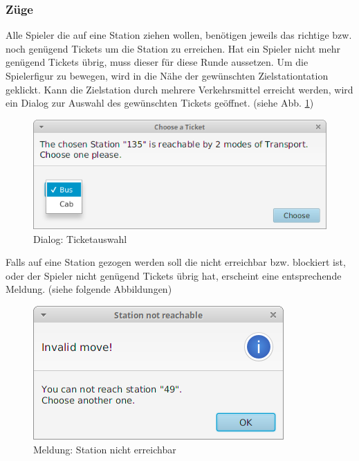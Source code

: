         \subsubsection{Züge}
            Alle Spieler die auf eine Station ziehen wollen, benötigen jeweils das richtige bzw. noch genügend Tickets um die Station zu erreichen.
            Hat ein Spieler nicht mehr genügend Tickets übrig, muss dieser für diese Runde aussetzen.
            \newline
            \newline
            Um die Spielerfigur zu bewegen, wird in die Nähe der gewünschten Zielstationtation geklickt.
            Kann die Zielstation durch mehrere Verkehrsmittel erreicht werden, wird ein Dialog zur Auswahl
            des gewünschten Tickets geöffnet. (siehe Abb. \ref{abb_dialogchooseticket})

            \begin{figure}[H]
                \centering
                \includegraphics[scale=0.6]{img/benutzerhandbuch/dialogchooseticket.png}   
                \caption{Dialog: Ticketauswahl}
                \label{abb_dialogchooseticket}
            \end{figure}
            Falls auf eine Station gezogen werden soll die nicht erreichbar bzw. blockiert
            ist, oder der Spieler nicht genügend Tickets übrig hat, erscheint eine entsprechende Meldung. 
            (siehe folgende Abbildungen)
            \begin{figure}[H]
                \centering
                \includegraphics[scale=0.7]{img/benutzerhandbuch/dialog_invalid_move.png}   
                \caption{Meldung: Station nicht erreichbar}
                \label{abb_dialog_invalid_move}
            \end{figure}

